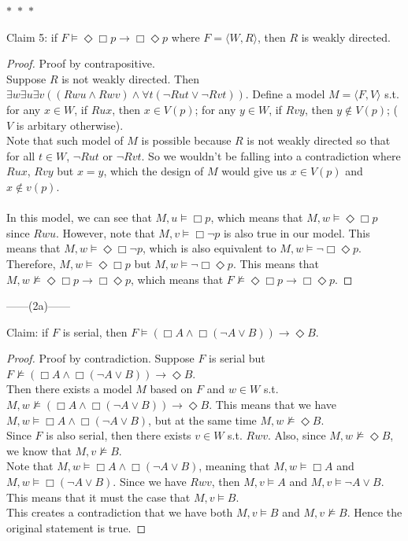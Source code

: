 \documentclass[12pt]{article}
\newcommand{\B}{\Box}
\newcommand{\D}{\Diamond}
\newcommand{\s}{\vDash}
\newcommand{\ns}{\nvDash}
\begin{document}
\noindent
\begin{center}
    $\ast$~$\ast$~$\ast$
\end{center}
Claim 5: if $F \vDash \D \B p \to \B \D p$ where $F = \langle W, R \rangle$, then $R$ is weakly directed. 
\begin{proof} Proof by contrapositive.\\
    Suppose $R$ is not weakly directed.
    Then $\exists w \exists u \exists v ((Rwu \land Rwv) \land \forall t(\neg Rut \lor \neg Rvt))$.
    Define a model $M  = \langle F, V \rangle$ s.t. for any $x \in W$, if $Rux$, then $x \in V(p)$; for any $y \in W$, if $Rvy$, then $y \notin V(p)$; ($V$ is arbitary otherwise).\\
    Note that such model of $M$ is possible because $R$ is not weakly directed so that for all $t \in W$, $\neg Rut$ or $\neg Rvt$. 
    So we wouldn't be falling into a contradiction where $Rux$, $Rvy$ but $x = y$, which the design of $M$ would give us $x \in V(p)$ and $x \notin v(p)$.\\
    \\
    In this model, we can see that $M, u \s \B p$, which means that $M, w \s \D \B p$ since $Rwu$.
    However, note that $M, v \s \B \neg p$ is also true in our model. 
    This means that $M, w \s \D \B \neg p$, which is also equivalent to $M, w \s \neg \B \D p$.\\
    Therefore, $M, w \s \D \B p$ but $M, w \s \neg \B \D p$.
    This means that $M, w \ns \D \B p \to \B \D p$, which means that $F \ns \D \B p \to \B \D p$.

\end{proof}

\newpage
\noindent
\begin{center}
    ------(2a)------
\end{center}
Claim: if $F$ is serial, then $F \s (\B A \land \B (\neg A \lor B)) \to \D B$.
\begin{proof} Proof by contradiction.
    Suppose $F$ is serial but $F \ns (\B A \land \B (\neg A \lor B)) \to \D B$.\\
    Then there exists a model $M$ based on $F$ and $w \in W$ s.t. $M, w \ns (\B A \land \B (\neg A \lor B)) \to \D B$.
    This means that we have $M, w \s \B A \land \B (\neg A \lor B)$, but at the same time $M, w \ns \D B$.\\
    Since $F$ is also serial, then there exists $v \in W$ s.t. $Rwv$. 
    Also, since $M, w \ns \D B$, we know that $M, v \ns B$.\\
    Note that $M, w \s \B A \land \B (\neg A \lor B)$, meaning that $M, w \s \B A$ and $M, w \s \B (\neg A \lor B)$. 
    Since we have $Rwv$, then $M, v \s A$ and $M, v \s \neg A \lor B$.
    This means that it must the case that $M, v \s B$.\\
    This creates a contradiction that we have both $M,v \s B$ and $M, v \ns B$.
    Hence the original statement is true.
\end{proof}
\end{document}
